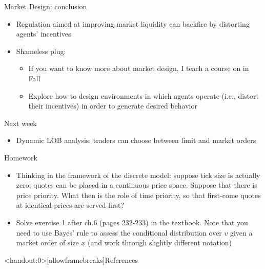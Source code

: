 \documentclass[english,10pt
,aspectratio=169
]{beamer}
\begin{document}
\begin{frame}{Market Design: conclusion}
	\begin{itemize}
		\item Regulation aimed at improving market liquidity can backfire by distorting agents' incentives
		\item Shameless plug:
		\begin{itemize}
			\item If you want to know more about market design, I teach a course on  in Fall
			\item Explore how to design environments in which agents operate (i.e., distort their incentives) in order to generate desired behavior
		\end{itemize}
	\end{itemize}
\end{frame}




\begin{frame}{Next week}
	\begin{itemize}
		\item Dynamic LOB analysis: traders can choose between limit and market orders
	\end{itemize}
\end{frame}


\begin{frame}{Homework}
	\begin{itemize}
		\item Thinking in the framework of the discrete model: suppose tick size is actually zero; quotes can be placed in a continuous price space. Suppose that there is price priority. What then is the role of time priority, so that first-come quotes at identical prices are served first?
		\item Solve exercise 1 after ch.6 (pages 232-233) in the textbook. Note that you need to use Bayes' rule to assess the conditional distribution over $v$ given a market order of size $x$ (and work through slightly different notation)
	\end{itemize}
\end{frame}





\appendix
\begin{frame}<handout:0>[allowframebreaks]{References}
	
	
\end{frame}
\end{document}

